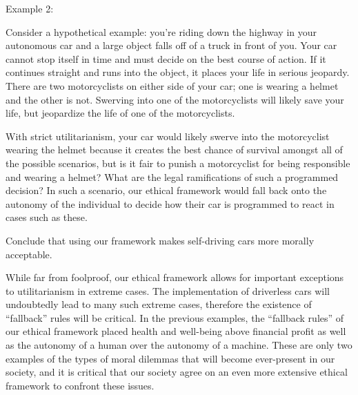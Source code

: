 {\large Example 2:}

Consider a hypothetical example: you're riding down the highway in your 
autonomous car and a large object falls off of a truck in front of you. 
Your car cannot stop itself in time and must decide on the best course 
of action. If it continues straight and runs into the object, it places 
your life in serious jeopardy. There are two motorcyclists on either 
side of your car; one is wearing a helmet and the other is not. Swerving 
into one of the motorcyclists will likely save your life, but jeopardize 
the life of one of the motorcyclists.

With strict utilitarianism, your car would likely swerve into the 
motorcyclist wearing the helmet because it creates the best chance of 
survival amongst all of the possible scenarios, but is it fair to punish 
a motorcyclist for being responsible and wearing a helmet? What are the 
legal ramifications of such a programmed decision? In such a scenario, 
our ethical framework would fall back onto the autonomy of the individual 
to decide how their car is programmed to react in cases such as these.

Conclude that using our framework makes self-driving cars more morally 
acceptable.

While far from foolproof, our ethical framework allows for important 
exceptions to utilitarianism in extreme cases. The implementation of 
driverless cars will undoubtedly lead to many such extreme cases, 
therefore the existence of “fallback” rules will be critical. In the 
previous examples, the “fallback rules” of our ethical framework placed 
health and well-being above financial profit as well as the autonomy of 
a human over the autonomy of a machine. These are only two examples of 
the types of moral dilemmas that will become ever-present in our 
society, and it is critical that our society agree on an even more 
extensive ethical framework to confront these issues.


